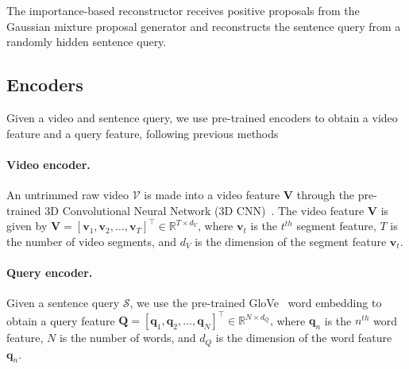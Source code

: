 The importance-based reconstructor receives positive proposals from the Gaussian mixture proposal generator and reconstructs the sentence query from a randomly hidden sentence query.

\subsection{Encoders}
\label{sec:encoders}

Given a video and sentence query, we use pre-trained encoders to obtain a video feature and a query feature, following previous methods~\cite{wu2020reinforcement,chen2021towards}

\paragraph{Video encoder.}
An untrimmed raw video $\mathcal{V}$ is made into a video feature $\mathbf{V}$ through the pre-trained 3D Convolutional Neural Network (3D CNN)~\cite{carreira2017quo, tran2015learning}.
The video feature $\mathbf{V}$ is given by
$\mathbf{V}=[\mathbf{v}_1,\mathbf{v}_2,\dots,\mathbf{v}_T]^\top \in \mathbb{R}^{T\times d_V} \text{,}$
where $\mathbf{v}_t$ is the $t^{th}$ segment feature, $T$ is the number of video segments, and $d_V$ is the dimension of the segment feature $\mathbf{v}_t$.

\paragraph{Query encoder.}
Given a sentence query $\mathcal{S}$, we use the pre-trained GloVe~\cite{pennington2014glove} word embedding to obtain a query feature $\mathbf{Q}=[\mathbf{q}_1,\mathbf{q}_2,\dots,\mathbf{q}_N]^\top \in \mathbb{R}^{N\times d_Q} \text{,}$
where $\mathbf{q}_n$ is the $n^{th}$ word feature, $N$ is the number of words, and $d_Q$ is the dimension of the word feature $\mathbf{q}_n$.




